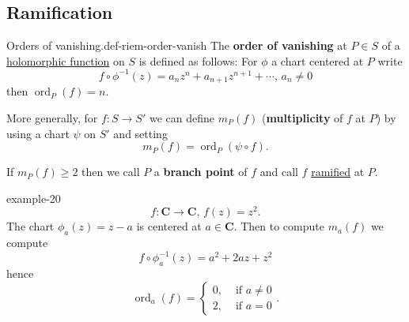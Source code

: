 \documentclass[10pt,]{book}
\newcommand{\terminology}[1]{\textbf{#1}}
\numberwithin{equation}{section}
\newcommand{\inv}{^{-1}}
\newcommand{\CC}{\mathbf{C}}
\DeclareMathOperator{\ord}{ord}
\newcommand{\amp}{&}
\begin{document}
\subsection[{Ramification}]{Ramification}\label{subsection-46}
\begin{definition}{Orders of vanishing.}{def-riem-order-vanish}%
\hypertarget{p-497}{}%
The \terminology{order of vanishing} at \(P\in S\) of a \hyperref[def-morph-riem-surf]{holomorphic function} on \(S\) is defined as follows: For \(\phi\) a  chart centered at \(P\) write%
\begin{equation*}
f\circ \phi\inv (z) = a_n z^n + a_{n+1}z^{n+1} + \cdots,\,a_n\ne 0
\end{equation*}
then \(\ord_P(f) = n\).%
\par
\hypertarget{p-498}{}%
More generally, for \(f\colon S \to S'\) we can define \(m_P(f)\) (\terminology{multiplicity} of \(f\) at \(P\)) by using a chart \(\psi\) on \(S'\) and setting%
\begin{equation*}
m_P(f) = \ord_P(\psi\circ f)\text{.}
\end{equation*}
%
\par
\hypertarget{p-499}{}%
If \(m_P(f)\ge 2\) then we call \(P\) a \terminology{branch point} of \(f\) and call \(f\) \hyperref[def-dess-ramified]{ramified} at \(P\).%
\end{definition}
\begin{example}{}{example-20}%
\hypertarget{p-500}{}%
%
\begin{equation*}
f\colon \CC \to \CC,\,f(z) = z^2\text{.}
\end{equation*}
The chart \(\phi_a(z) = z-a\) is centered at \(a \in \CC\). Then to compute \(m_a(f)\) we compute%
\begin{equation*}
f\circ \phi\inv_a(z) = a^2 + 2az + z^2
\end{equation*}
hence%
\begin{equation*}
\ord_a(f) =\begin{cases} 0,\amp \text{ if } a\ne 0\\ 2,\amp\text{ if } a= 0\end{cases}\text{.}
\end{equation*}
%
\end{example}
%
%
\typeout{************************************************}
\typeout{************************************************}
%
\end{document}
